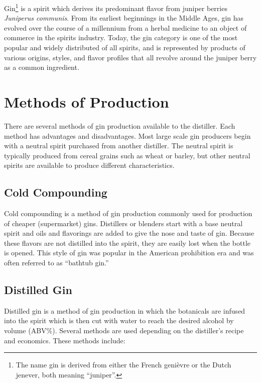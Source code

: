 Gin\footnote{The name gin is derived from either the French genièvre or the
Dutch jenever, both meaning ``juniper''.} is a spirit which derives its
predominant flavor from juniper berries \emph{Juniperus communis}. From its
earliest beginnings in the Middle Ages, gin has evolved over the course of a
millennium from a herbal medicine to an object of commerce in the spirits
industry. Today, the gin category is one of the most popular and widely
distributed of all spirits, and is represented by products of various origins,
styles, and flavor profiles that all revolve around the juniper berry as a
common ingredient. \parencite{wiki:gin}


\section{Methods of Production} There are several methods of gin production
available to the distiller. Each method has advantages and disadvantages. Most
large scale gin producers begin with a neutral spirit purchased from another
distiller. The neutral spirit is typically produced from cereal grains such as
wheat or barley, but other neutral spirits are available to produce different
characteristics.

\subsection{Cold Compounding}
Cold compounding is a method of gin production commonly used for production of
cheaper (supermarket)  gins.  Distillers or blenders
start with a base neutral spirit and oils and flavorings are added to give the
nose and taste of gin. Because these flavors are not distilled into the spirit,
they are easily lost when the bottle is opened. This style of gin was popular
in the American prohibition era and was often referred to as ``bathtub gin.''

\subsection{Distilled Gin}
Distilled gin is a method of gin production in which the botanicals are infused
into the spirit which is then cut with water to reach the desired alcohol by
volume (ABV\%). Several methods are used depending on the distiller's recipe
and economics. These methods include: 


